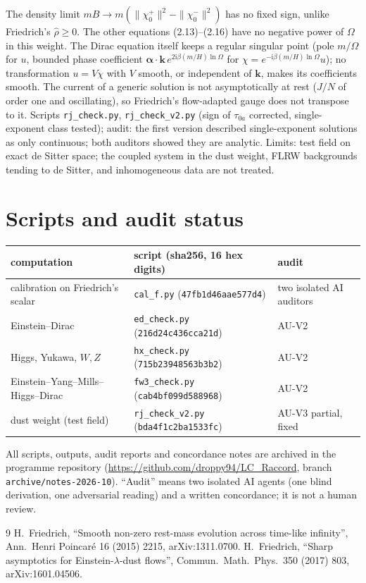 \documentclass[11pt,a4paper]{article}
\newcommand{\ii}{\mathrm{i}}
\begin{document}
The density limit $mB\to m(\|\chi_{0}^{+}\|^{2}-\|\chi_{0}^{-}\|^{2})$ has no fixed sign, unlike Friedrich's $\hat\rho\ge0$. The other equations (2.13)--(2.16) have no negative power of $\Omega$ in this weight. The Dirac equation itself keeps a regular singular point (pole $m/\Omega$ for $u$, bounded phase coefficient $\boldsymbol\alpha\cdot\mathbf{k}\,e^{2\ii\beta(m/H)\ln\Omega}$ for $\chi=e^{-\ii\beta(m/H)\ln\Omega}u$); no transformation $u=V\chi$ with $V$ smooth, or independent of $\mathbf{k}$, makes its coefficients smooth. The current of a generic solution is not asymptotically at rest ($J/N$ of order one and oscillating), so Friedrich's flow-adapted gauge does not transpose to it. Scripts \texttt{rj\_check.py}, \texttt{rj\_check\_v2.py} (sign of $\tau_{0a}$ corrected, single-exponent class tested); audit: the first version described single-exponent solutions as only continuous; both auditors showed they are analytic. Limits: test field on exact de Sitter space; the coupled system in the dust weight, FLRW backgrounds tending to de Sitter, and inhomogeneous data are not treated.

\section{Scripts and audit status}
\begin{center}\small
\begin{tabular}{lll}
\toprule
computation & script (sha256, 16 hex digits) & audit\\
\midrule
calibration on Friedrich's scalar & \texttt{cal\_f.py} (\texttt{47fb1d46aae577d4}) & two isolated AI auditors\\
Einstein--Dirac & \texttt{ed\_check.py} (\texttt{216d24c436cca21d}) & AU-V2\\
Higgs, Yukawa, $W,Z$ & \texttt{hx\_check.py} (\texttt{715b23948563b3b2}) & AU-V2\\
Einstein--Yang--Mills--Higgs--Dirac & \texttt{fw3\_check.py} (\texttt{cab4bf099d588968}) & AU-V2\\
dust weight (test field) & \texttt{rj\_check\_v2.py} (\texttt{bda4f1c2ba1533fc}) & AU-V3 partial, fixed\\
\bottomrule
\end{tabular}
\end{center}
All scripts, outputs, audit reports and concordance notes are archived in the programme repository (\url{https://github.com/droppy94/LC_Raccord}, branch \texttt{archive/notes-2026-10}). ``Audit'' means two isolated AI agents (one blind derivation, one adversarial reading) and a written concordance; it is not a human review.

\begin{thebibliography}{9}
 H.~Friedrich, ``Smooth non-zero rest-mass evolution across time-like infinity'', Ann.\ Henri Poincar\'e 16 (2015) 2215, arXiv:1311.0700.
 H.~Friedrich, ``Sharp asymptotics for Einstein-$\lambda$-dust flows'', Commun.\ Math.\ Phys.\ 350 (2017) 803, arXiv:1601.04506.
\end{thebibliography}
\end{document}
